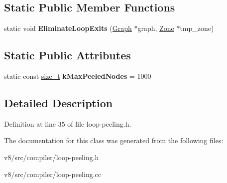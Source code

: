 \subsection*{Static Public Member Functions}
\begin{DoxyCompactItemize}
\item 
\mbox{\label{classv8_1_1internal_1_1compiler_1_1LoopPeeler_a18a65d8c106e257295a0025f9746888e}} 
static void {\bfseries Eliminate\+Loop\+Exits} (\mbox{\hyperlink{classv8_1_1internal_1_1compiler_1_1Graph}{Graph}} $\ast$graph, \mbox{\hyperlink{classv8_1_1internal_1_1Zone}{Zone}} $\ast$tmp\+\_\+zone)
\end{DoxyCompactItemize}
\subsection*{Static Public Attributes}
\begin{DoxyCompactItemize}
\item 
\mbox{\label{classv8_1_1internal_1_1compiler_1_1LoopPeeler_ab61bb8dce48cdd81ffcf24a008a0cb6c}} 
static const \mbox{\hyperlink{classsize__t}{size\+\_\+t}} {\bfseries k\+Max\+Peeled\+Nodes} = 1000
\end{DoxyCompactItemize}


\subsection{Detailed Description}


Definition at line 35 of file loop-\/peeling.\+h.



The documentation for this class was generated from the following files\+:\begin{DoxyCompactItemize}
\item 
v8/src/compiler/loop-\/peeling.\+h\item 
v8/src/compiler/loop-\/peeling.\+cc\end{DoxyCompactItemize}
